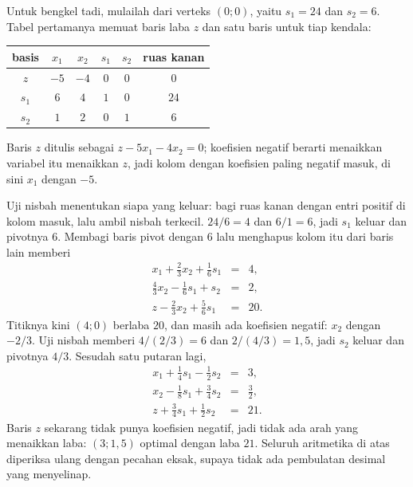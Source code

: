 
Untuk bengkel tadi, mulailah dari verteks $(0;0)$, yaitu $s_{1}=24$ dan $s_{2}=6$. Tabel
pertamanya memuat baris laba $z$ dan satu baris untuk tiap kendala:
\begin{center}
\begin{tabular}{c|cccc|c}
\hline
basis & $x_{1}$ & $x_{2}$ & $s_{1}$ & $s_{2}$ & ruas kanan \\
\hline
$z$   & $-5$ & $-4$ & $0$ & $0$ & $0$ \\
$s_{1}$ & $6$ & $4$ & $1$ & $0$ & $24$ \\
$s_{2}$ & $1$ & $2$ & $0$ & $1$ & $6$ \\
\hline
\end{tabular}
\end{center}
Baris $z$ ditulis sebagai $z-5x_{1}-4x_{2}=0$; koefisien negatif berarti menaikkan variabel
itu menaikkan $z$, jadi kolom dengan koefisien paling negatif masuk, di sini $x_{1}$ dengan
$-5$.

Uji nisbah menentukan siapa yang keluar: bagi ruas kanan dengan entri positif di kolom
masuk, lalu ambil nisbah terkecil. $24/6=4$ dan $6/1=6$, jadi $s_{1}$ keluar dan pivotnya
$6$. Membagi baris pivot dengan $6$ lalu menghapus kolom itu dari baris lain memberi
\[
  \begin{array}{rcl}
    x_{1}+\tfrac{2}{3}x_{2}+\tfrac{1}{6}s_{1} &=& 4,\\
    \tfrac{4}{3}x_{2}-\tfrac{1}{6}s_{1}+s_{2} &=& 2,\\
    z-\tfrac{2}{3}x_{2}+\tfrac{5}{6}s_{1} &=& 20 .
  \end{array}
\]
Titiknya kini $(4;0)$ berlaba $20$, dan masih ada koefisien negatif: $x_{2}$ dengan
$-2/3$. Uji nisbah memberi $4/(2/3)=6$ dan $2/(4/3)=1{,}5$, jadi $s_{2}$ keluar dan
pivotnya $4/3$. Sesudah satu putaran lagi,
\[
  \begin{array}{rcl}
    x_{1}+\tfrac{1}{4}s_{1}-\tfrac{1}{2}s_{2} &=& 3,\\
    x_{2}-\tfrac{1}{8}s_{1}+\tfrac{3}{4}s_{2} &=& \tfrac{3}{2},\\
    z+\tfrac{3}{4}s_{1}+\tfrac{1}{2}s_{2} &=& 21 .
  \end{array}
\]
Baris $z$ sekarang tidak punya koefisien negatif, jadi tidak ada arah yang menaikkan laba:
$(3;1{,}5)$ optimal dengan laba $21$. Seluruh aritmetika di atas diperiksa ulang dengan pecahan eksak, supaya tidak ada
pembulatan desimal yang menyelinap.

